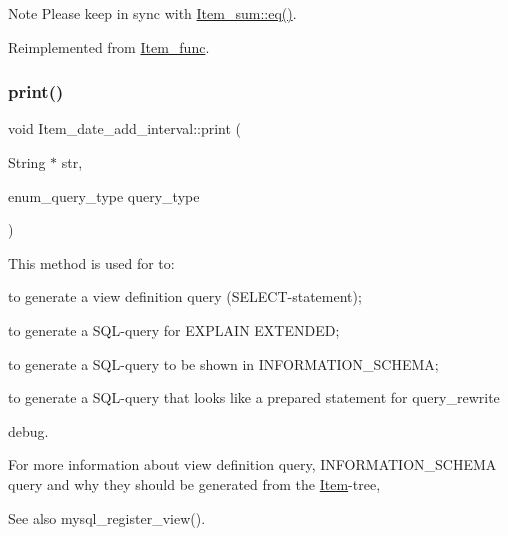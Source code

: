 \begin{DoxyNote}{Note}
Please keep in sync with \mbox{\hyperlink{classItem__sum_aeab749252b834e0be4f00aac8ca523f5}{Item\+\_\+sum\+::eq()}}. 
\end{DoxyNote}


Reimplemented from \mbox{\hyperlink{classItem__func_a3de3f23377e6f0006dfccd375086365f}{Item\+\_\+func}}.

\mbox{\label{classItem__date__add__interval_aef41086a34899cc2cfa46ab05a46dc7a}} 
\subsubsection{\texorpdfstring{print()}{print()}}
{\footnotesize\ttfamily void Item\+\_\+date\+\_\+add\+\_\+interval\+::print (\begin{DoxyParamCaption}\item[{String $\ast$}]{str,  }\item[{enum\+\_\+query\+\_\+type}]{query\+\_\+type }\end{DoxyParamCaption})\hspace{0.3cm}{\ttfamily [virtual]}}

This method is used for to\+:
\begin{DoxyItemize}
\item to generate a view definition query (S\+E\+L\+E\+CT-\/statement);
\item to generate a S\+QL-\/query for E\+X\+P\+L\+A\+IN E\+X\+T\+E\+N\+D\+ED;
\item to generate a S\+QL-\/query to be shown in I\+N\+F\+O\+R\+M\+A\+T\+I\+O\+N\+\_\+\+S\+C\+H\+E\+MA;
\item to generate a S\+QL-\/query that looks like a prepared statement for query\+\_\+rewrite
\item debug.
\end{DoxyItemize}

For more information about view definition query, I\+N\+F\+O\+R\+M\+A\+T\+I\+O\+N\+\_\+\+S\+C\+H\+E\+MA query and why they should be generated from the \mbox{\hyperlink{classItem}{Item}}-\/tree, \begin{DoxySeeAlso}{See also}
mysql\+\_\+register\+\_\+view(). 
\end{DoxySeeAlso}


